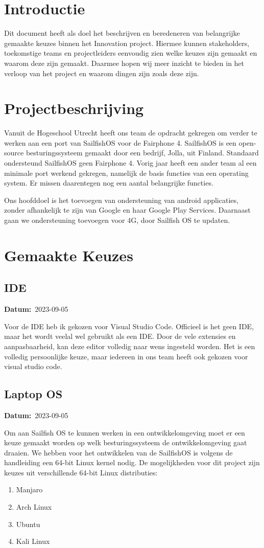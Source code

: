 \documentclass[a4paper]{report}
\newcommand{\personalbox}{
  \begin{tcolorbox}[hbox, colback=green!5!white,colframe=green!75!black,
    left=.1mm, right=.1mm, top=.1mm, bottom=.1mm, fontupper=\scriptsize\sffamily]
    Persoonlijke Keuze
  \end{tcolorbox}
}
\newcommand{\personalchoice}[1]{
  \section[ #1 ]{#1~\mbox{\raisebox{-2.5pt}{\personalbox}}}
}
\newcommand{\timestamp}[1]{
  \mbox{\scriptsize \textbf{Datum:} #1} \smallbreak
}
\begin{document}
\chapter{Introductie}
Dit document heeft als doel het beschrijven en beredeneren van belangrijke gemaakte keuzes binnen het Innovation project. 
Hiermee kunnen stakeholders, toekomstige teams en projectleiders eenvoudig zien welke keuzes zijn gemaakt en waarom deze zijn gemaakt.
Daarmee hopen wij meer inzicht te bieden in het verloop van het project en waarom dingen zijn zoals deze zijn.


\chapter{Projectbeschrijving}
Vanuit de Hogeschool Utrecht heeft ons team de opdracht gekregen om verder te werken aan een port van SailfishOS voor de Fairphone 4.
SailfishOS is een open-source besturingssysteem gemaakt door een bedrijf, Jolla, uit Finland. Standaard ondersteund SailfishOS geen Fairphone 4.
Vorig jaar heeft een ander team al een minimale port werkend gekregen, namelijk de basis functies van een operating system. Er missen daarentegen nog een aantal belangrijke functies.
\par \smallskip
Ons hoofddoel is het toevoegen van ondersteuning van android applicaties, zonder afhankelijk te zijn van Google en haar Google Play Services\texttrademark. 
Daarnaast gaan we ondersteuning toevoegen voor 4G, door Sailfish OS te updaten.


\chapter{Gemaakte Keuzes}
\personalchoice{IDE}
\timestamp{2023-09-05}
Voor de IDE heb ik gekozen voor Visual Studio Code. Officieel is het geen IDE, maar het wordt veelal wel gebruikt als een IDE. 
Door de vele extensies en aanpasbaarheid, kan deze editor volledig naar wens ingesteld worden. 
Het is een volledig persoonlijke keuze, maar iedereen in ons team heeft ook gekozen voor visual studio code.

\personalchoice{Laptop OS}
\timestamp{2023-09-05}
Om aan Sailfish OS te kunnen werken in een ontwikkelomgeving moet er een keuze gemaakt worden op welk besturingssysteem de ontwikkelomgeving gaat draaien. We hebben voor het ontwikkelen van de SailfishOS is volgens de handleiding een 64-bit Linux kernel nodig.  
De mogelijkheden voor dit project zijn keuzes uit verschillende 64-bit Linux distributies: 
\begin{enumerate}
  \item Manjaro 
  \item Arch Linux
  \item Ubuntu
  \item Kali Linux
\end{enumerate}
\end{document}

